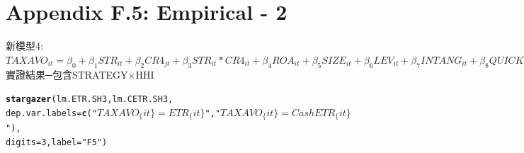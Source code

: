 \documentclass[a4paper]{article}\usepackage[]{graphicx}\usepackage[]{color}
\makeatletter
\newcommand{\hlnum}[1]{\textcolor[rgb]{0.686,0.059,0.569}{#1}}%
\newcommand{\hlstr}[1]{\textcolor[rgb]{0.192,0.494,0.8}{#1}}%
\newcommand{\hlstd}[1]{\textcolor[rgb]{0.345,0.345,0.345}{#1}}%
\newcommand{\hlkwc}[1]{\textcolor[rgb]{0.333,0.667,0.333}{#1}}%
\newcommand{\hlkwd}[1]{\textcolor[rgb]{0.737,0.353,0.396}{\textbf{#1}}}%
\newenvironment{kframe}{%
 \def\at@end@of@kframe{}%
 \ifinner\ifhmode%
  \def\at@end@of@kframe{\end{minipage}}%
  \begin{minipage}{\columnwidth}%
 \fi\fi%
 \def\FrameCommand##1{\hskip\@totalleftmargin \hskip-\fboxsep
 \colorbox{shadecolor}{##1}\hskip-\fboxsep
     \hskip-\linewidth \hskip-\@totalleftmargin \hskip\columnwidth}%
 \MakeFramed {\advance\hsize-\width
   \@totalleftmargin\z@ \linewidth\hsize
   \@setminipage}}%
 {\par\unskip\endMakeFramed%
 \at@end@of@kframe}
\makeatother
\begin{document}
\section{\\Appendix F.5: Empirical - 2} \label{App:Appendix F.5}
新模型4:\\
$TAXAVO_{it}=\beta_{0}+\beta_{1}STR_{it}+\beta_{2}CR4_{jt}+\beta_{3}STR_{it}*CR4_{it}+\beta_{4}ROA_{it}+\beta_{5}SIZE_{it}+\beta_{6}LEV_{it}+\beta_{7}INTANG_{it}+\beta_{8}QUICK_{it}+\beta_{9}EQINC_{it}+\beta_{10}OUTINSTI_{it}+\beta_{11}RELAT_{it}+\beta_{12}FAMILY_{it}+\beta_{13}GDP_{it}+\varepsilon_{14}$\\
實證結果─包含STRATEGY×HHI\\
\begin{kframe}
\begin{alltt}
  \hlkwd{stargazer}\hlstd{(lm.ETR.SH3,lm.CETR.SH3,}
    \hlkwc{dep.var.labels} \hlstd{=} \hlkwd{c}\hlstd{(}\hlstr{"$TAXAVO_\{it\}=ETR_\{it\}$"}\hlstd{,}\hlstr{"$TAXAVO_\{it\}=CashETR_\{it\}$"}\hlstd{),}
    \hlkwc{digits}\hlstd{=}\hlnum{3}\hlstd{,}\hlkwc{label} \hlstd{=} \hlstr{"F5"}\hlstd{)}
\end{alltt}
\end{kframe}
\end{document}
